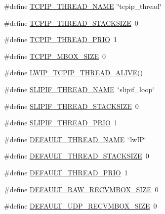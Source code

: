 \begin{DoxyCompactItemize}
\item 
\#define \hyperlink{group__lwip__opts__thread_ga405e604e4328e1feb878c6fe1798a587}{T\+C\+P\+I\+P\+\_\+\+T\+H\+R\+E\+A\+D\+\_\+\+N\+A\+ME}~\char`\"{}tcpip\+\_\+thread\char`\"{}
\item 
\#define \hyperlink{group__lwip__opts__thread_gaa02b84eafa0c8b09b158b97c96d79db0}{T\+C\+P\+I\+P\+\_\+\+T\+H\+R\+E\+A\+D\+\_\+\+S\+T\+A\+C\+K\+S\+I\+ZE}~0
\item 
\#define \hyperlink{group__lwip__opts__thread_ga42b2c7a3042d7c3efd00f367f5837435}{T\+C\+P\+I\+P\+\_\+\+T\+H\+R\+E\+A\+D\+\_\+\+P\+R\+IO}~1
\item 
\#define \hyperlink{group__lwip__opts__thread_ga8cf210ad4e4bf616860a45fbd140fd06}{T\+C\+P\+I\+P\+\_\+\+M\+B\+O\+X\+\_\+\+S\+I\+ZE}~0
\item 
\#define \hyperlink{group__lwip__opts__thread_ga8b99d75d9e0a0868567d10c8522915bb}{L\+W\+I\+P\+\_\+\+T\+C\+P\+I\+P\+\_\+\+T\+H\+R\+E\+A\+D\+\_\+\+A\+L\+I\+VE}()
\item 
\#define \hyperlink{group__lwip__opts__thread_gae9cd260c56472324a2f0ee5f9597a675}{S\+L\+I\+P\+I\+F\+\_\+\+T\+H\+R\+E\+A\+D\+\_\+\+N\+A\+ME}~\char`\"{}slipif\+\_\+loop\char`\"{}
\item 
\#define \hyperlink{group__lwip__opts__thread_gae8ab54a25007ce997bbab6289815e258}{S\+L\+I\+P\+I\+F\+\_\+\+T\+H\+R\+E\+A\+D\+\_\+\+S\+T\+A\+C\+K\+S\+I\+ZE}~0
\item 
\#define \hyperlink{group__lwip__opts__thread_gab1b9fc2efcbf1f804bfd0191bc019c4e}{S\+L\+I\+P\+I\+F\+\_\+\+T\+H\+R\+E\+A\+D\+\_\+\+P\+R\+IO}~1
\item 
\#define \hyperlink{group__lwip__opts__thread_gaca13123a5c8271558353e04123957616}{D\+E\+F\+A\+U\+L\+T\+\_\+\+T\+H\+R\+E\+A\+D\+\_\+\+N\+A\+ME}~\char`\"{}lw\+IP\char`\"{}
\item 
\#define \hyperlink{group__lwip__opts__thread_ga7f93dfeaed4021061959f822def602cb}{D\+E\+F\+A\+U\+L\+T\+\_\+\+T\+H\+R\+E\+A\+D\+\_\+\+S\+T\+A\+C\+K\+S\+I\+ZE}~0
\item 
\#define \hyperlink{group__lwip__opts__thread_ga3d8715b1fdd0449d6c214e4a40108456}{D\+E\+F\+A\+U\+L\+T\+\_\+\+T\+H\+R\+E\+A\+D\+\_\+\+P\+R\+IO}~1
\item 
\#define \hyperlink{group__lwip__opts__thread_ga4ef8f046c957750056131310a1580df7}{D\+E\+F\+A\+U\+L\+T\+\_\+\+R\+A\+W\+\_\+\+R\+E\+C\+V\+M\+B\+O\+X\+\_\+\+S\+I\+ZE}~0
\item 
\#define \hyperlink{group__lwip__opts__thread_ga09fe785559b3f0cf108da4440489e335}{D\+E\+F\+A\+U\+L\+T\+\_\+\+U\+D\+P\+\_\+\+R\+E\+C\+V\+M\+B\+O\+X\+\_\+\+S\+I\+ZE}~0

\end{DoxyCompactItemize}
